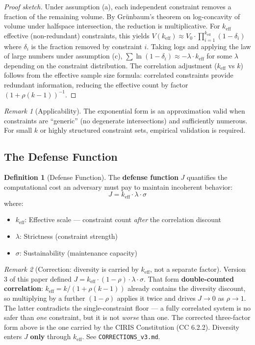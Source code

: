\documentclass[11pt,a4paper]{article}
\theoremstyle{definition}
\newtheorem{definition}{Definition}[section]
\theoremstyle{remark}
\newtheorem{remark}{Remark}[section]
\newcommand{\keff}{k_{\text{eff}}}
\begin{document}
\begin{proof}[Proof sketch]
Under assumption (a), each independent constraint removes a fraction of the remaining volume. By Gr\"unbaum's theorem on log-concavity of volume under halfspace intersection, the reduction is multiplicative. For $\keff$ effective (non-redundant) constraints, this yields $V(\keff) \approx V_0 \cdot \prod_{i=1}^{\keff} (1 - \delta_i)$ where $\delta_i$ is the fraction removed by constraint $i$. Taking logs and applying the law of large numbers under assumption (c), $\sum \ln(1-\delta_i) \approx -\lambda \cdot \keff$ for some $\lambda$ depending on the constraint distribution. The correlation adjustment ($\keff$ vs $k$) follows from the effective sample size formula: correlated constraints provide redundant information, reducing the effective count by factor $(1 + \rho(k-1))^{-1}$.
\end{proof}

\begin{remark}[Applicability]
The exponential form is an approximation valid when constraints are ``generic'' (no degenerate intersections) and sufficiently numerous. For small $k$ or highly structured constraint sets, empirical validation is required.
\end{remark}

\subsection{The Defense Function}

\begin{definition}[Defense Function]
The \textbf{defense function} $J$ quantifies the computational cost an adversary must pay to maintain incoherent behavior:
\begin{equation}
J = \keff \cdot \lambda \cdot \sigma
\label{eq:defense}
\end{equation}
where:
\begin{itemize}[noitemsep]
    \item $\keff$: Effective scale --- constraint count \textit{after} the correlation discount
    \item $\lambda$: Strictness (constraint strength)
    \item $\sigma$: Sustainability (maintenance capacity)
\end{itemize}
\end{definition}

\begin{remark}[Correction: diversity is carried by $\keff$, not a separate factor]
Version 3 of this paper defined $J = \keff \cdot (1-\rho) \cdot \lambda \cdot \sigma$. That form \textbf{double-counted correlation}: $\keff = k/(1+\rho(k-1))$ already contains the diversity discount, so multiplying by a further $(1-\rho)$ applies it twice and drives $J \to 0$ as $\rho \to 1$. The latter contradicts the single-constraint floor --- a fully correlated system is no safer than \textit{one} constraint, but it is not \textit{worse} than one. The corrected three-factor form above is the one carried by the CIRIS Constitution (CC 6.2.2). Diversity enters $J$ \textbf{only} through $\keff$. See \texttt{CORRECTIONS\_v3.md}.
\end{remark}
\end{document}
